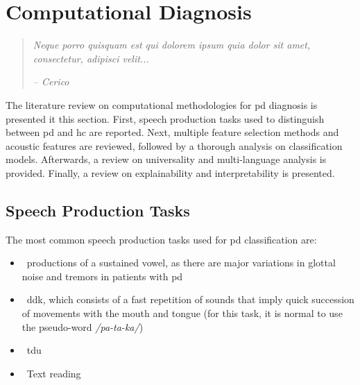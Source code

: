 
\chapter{Computational Diagnosis}
\label{ch:irure}

\begin{quotation}
  {\small\it Neque porro quisquam est qui dolorem ipsum quia dolor sit amet, consectetur, adipisci velit...}

{\small\it -- Cerico}
\end{quotation}


The literature review on computational methodologies for \gls{pd} diagnosis is presented it this section. First, speech production tasks used to distinguish between \gls{pd} and \gls{hc} are reported. Next, multiple feature selection methods and acoustic features are reviewed, followed by a thorough analysis on classification models. Afterwards, a review on universality and multi-language analysis is provided. Finally, a review on explainability and interpretability is presented.


\section{Speech Production Tasks}

The most common speech production tasks used for \gls{pd} classification are:
\\
\begin{itemize}
	\item ~productions of a sustained vowel, as there are major variations in glottal noise and tremors in patients with \gls{pd} \cite{idiopathic_parkinson}
	\item ~\gls{ddk}, which consists of a fast repetition of sounds that imply quick succession of movements with the mouth and tongue (for this task, it is normal to use the pseudo-word \textit{/pa-ta-ka/})
	\item ~\gls{tdu}
	\item ~Text reading
\end{itemize}

